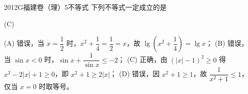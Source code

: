 
\begin{problem}{2012}{G}{福建卷（理）}{5}{不等式}
下列不等式一定成立的是
\begin{choices}
\end{choices}
\end{problem}

\begin{answer}
(C)
\end{answer}

\begin{solutions}
(A) 错误，当 $ x = \dfrac{1}{2} $ 时，$ x^2 + \dfrac{1}{4} = \dfrac{1}{2} = x $，故 $ \lg\left(x^2 + \dfrac{1}{4}\right) = \lg x $；  
(B) 错误，当 $ \sin x < 0 $ 时，$ \sin x + \dfrac{1}{\sin x} \leqslant -2 $；  
(C) 正确，由 $ (|x| - 1)^2 \geqslant 0 $ 得 $ x^2 - 2|x| + 1 \geqslant 0 $，即 $ x^2 + 1 \geqslant 2|x| $；  
(D) 错误，因 $ x^2 + 1 \geqslant 1 $，故 $ \dfrac{1}{x^2 + 1} \leqslant 1 $，仅当 $ x = 0 $ 时取等号。
\end{solutions}
